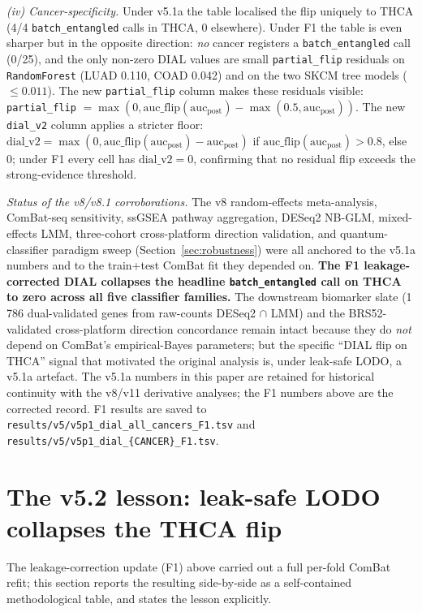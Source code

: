 \documentclass[11pt,a4paper]{article}
\begin{document}
\textit{(iv) Cancer-specificity.} Under v5.1a the table localised the
flip uniquely to THCA (4/4 \texttt{batch\_entangled} calls in THCA, 0
elsewhere). Under F1 the table is even sharper but in the opposite
direction: \emph{no} cancer registers a \texttt{batch\_entangled} call
(0/25), and the only non-zero $\mathrm{DIAL}$ values are small
\texttt{partial\_flip} residuals on \texttt{RandomForest} (LUAD 0.110,
COAD 0.042) and on the two SKCM tree models ($\le 0.011$). The new
\texttt{partial\_flip} column makes these residuals visible:
\texttt{partial\_flip} $= \max(0, \mathrm{auc\_flip}(\mathrm{auc}_{\mathrm{post}})
- \max(0.5, \mathrm{auc}_{\mathrm{post}}))$. The new
\texttt{dial\_v2} column applies a stricter floor:
$\mathrm{dial\_v2} = \max(0, \mathrm{auc\_flip}(\mathrm{auc}_{\mathrm{post}})
- \mathrm{auc}_{\mathrm{post}})$ if $\mathrm{auc\_flip}(\mathrm{auc}_{\mathrm{post}}) > 0.8$,
else 0; under F1 every cell has $\mathrm{dial\_v2} = 0$, confirming
that no residual flip exceeds the strong-evidence threshold.

\textit{Status of the v8/v8.1 corroborations.} The v8 random-effects
meta-analysis, ComBat-seq sensitivity, ssGSEA pathway aggregation,
DESeq2 NB-GLM, mixed-effects LMM, three-cohort cross-platform
direction validation, and quantum-classifier paradigm sweep
(Section~\ref{sec:robustness}) were all anchored to the v5.1a numbers
and to the train+test ComBat fit they depended on. \textbf{The F1
leakage-corrected DIAL collapses the headline
\texttt{batch\_entangled} call on THCA to zero across all five
classifier families.} The downstream biomarker slate (1\,786 dual-validated
genes from raw-counts DESeq2 $\cap$ LMM) and the BRS52-validated
cross-platform direction concordance remain intact because they do
\emph{not} depend on ComBat's empirical-Bayes parameters; but the
specific ``DIAL flip on THCA'' signal that motivated the original
analysis is, under leak-safe LODO, a v5.1a artefact. The v5.1a
numbers in this paper are retained for historical continuity with the
v8/v11 derivative analyses; the F1 numbers above are the corrected
record. F1 results are saved to
\texttt{results/v5/v5p1\_dial\_all\_cancers\_F1.tsv} and
\texttt{results/v5/v5p1\_dial\_\{CANCER\}\_F1.tsv}.

\section{The v5.2 lesson: leak-safe LODO collapses the THCA flip}
\label{sec:v5p2lesson}
The leakage-correction update (F1) above carried out a full per-fold
ComBat refit; this section reports the resulting side-by-side as a
self-contained methodological table, and states the lesson explicitly.
\end{document}
